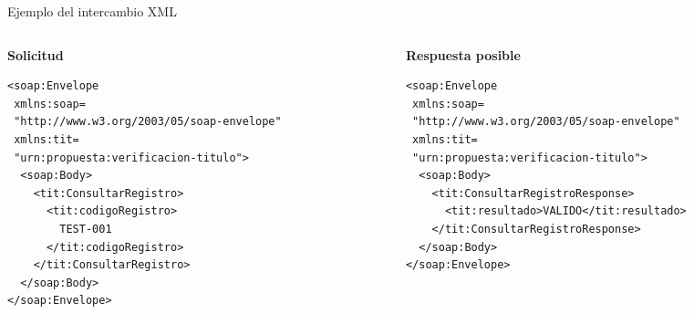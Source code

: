\begin{frame}[fragile,t]{Ejemplo del intercambio XML}

\begin{columns}[T,onlytextwidth]
\begin{column}{.49\textwidth}
{\color{acento}\bfseries Solicitud}\\[2mm]
{\scriptsize
\begin{verbatim}
<soap:Envelope
 xmlns:soap=
 "http://www.w3.org/2003/05/soap-envelope"
 xmlns:tit=
 "urn:propuesta:verificacion-titulo">
  <soap:Body>
    <tit:ConsultarRegistro>
      <tit:codigoRegistro>
        TEST-001
      </tit:codigoRegistro>
    </tit:ConsultarRegistro>
  </soap:Body>
</soap:Envelope>
\end{verbatim}
}
\end{column}

\begin{column}{.49\textwidth}
{\color{acento}\bfseries Respuesta posible}\\[2mm]
{\scriptsize
\begin{verbatim}
<soap:Envelope
 xmlns:soap=
 "http://www.w3.org/2003/05/soap-envelope"
 xmlns:tit=
 "urn:propuesta:verificacion-titulo">
  <soap:Body>
    <tit:ConsultarRegistroResponse>
      <tit:resultado>VALIDO</tit:resultado>
    </tit:ConsultarRegistroResponse>
  </soap:Body>
</soap:Envelope>
\end{verbatim}
}
\end{column}
\end{columns}

\medskip
{}
\end{frame}


